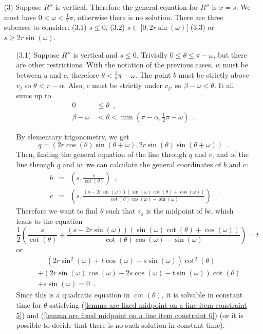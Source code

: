 \documentclass[11pt, oneside]{article}
\begin{document}
\begin{enumerate}
\item[(3)] Suppose $R''$ is vertical.
Therefore the general equation for $R''$ is $x=s$.
We must have
$0< \omega <\frac{1}{2}\pi$,
otherwise there is no solution.
There are three subcases to consider:
(3.1) $s\leq 0$,
(3.2) $s\in\,]0,2r\sin(\omega)[$
(3.3) or $s\geq 2r\sin(\omega)$.

\begin{enumerate}
\item[(3.1)] Suppose $R''$ is vertical and $s\leq 0$.
Trivially $0 \leq \theta \leq \pi-\omega$,
but there are other restrictions.
With the notation of the previous cases,
$w$ must be between $q$ and $c$,
therefore $\theta < \frac{1}{2}\pi-\omega$.
The point $b$ must be strictly above $v_j$
so $\theta < \pi-\alpha$.
Also,
$c$ must be strictly under $v_j$,
so $\beta-\omega < \theta$.
It all sums up to
\begin{align}
\label{lemma arc fixed midpoint on a line item constraint 5}
0 &\,\leq \theta \enspace,\\
\label{lemma arc fixed midpoint on a line item constraint 6}
\beta-\omega &\,< \theta < \min\left(\pi-\alpha,\frac{1}{2}\pi-\omega\right) \enspace.
\end{align}

By elementary trigonometry,
we get
$$q = (2r\cos(\theta)\sin(\theta+\omega),2r\sin(\theta)\sin(\theta+\omega)) \enspace.$$
Then,
finding the general equation of the line through $q$ and $v$,
and of the line through $q$ and $w$,
we can calculate the general coordinates of $b$ and $c$:
\begin{eqnarray*}
b &=& \left(s,\frac{s}{\cot(\theta)}\right) \enspace,\\
c &=& \left(s,\frac{(s-2r\sin(\omega))(\sin(\omega)\cot(\theta)+\cos(\omega))}{\cot(\theta)\cos(\omega)-\sin(\omega)}\right) \enspace.
\end{eqnarray*}
Therefore we want to find $\theta$ such that
$v_j$ is the midpoint of $bc$,
which leads to the equation
$$\frac{1}{2}\left(\frac{s}{\cot(\theta)} + \frac{(s-2r\sin(\omega))(\sin(\omega)\cot(\theta)+\cos(\omega))}{\cot(\theta)\cos(\omega)-\sin(\omega)}\right) = t$$
or
\begin{eqnarray}
\nonumber
&&\phantom{+}(2r\sin^2\!(\omega)+t\cos(\omega)-s\sin(\omega))\cot^2\!(\theta)\\
\nonumber
&&+(2r\sin(\omega)\cos(\omega)-2s\cos(\omega)-t\sin(\omega))\cot(\theta)\\
\label{eqn quad proof 2}
&&+s\sin(\omega) = 0 \enspace.
\end{eqnarray}
Since this is a quadratic equation in $\cot(\theta)$,
it is solvable in constant time 
for $\theta$ satisfying (\ref{lemma arc fixed midpoint on a line item constraint 5})
and (\ref{lemma arc fixed midpoint on a line item constraint 6})
(or it is possible to decide 
that there is no such solution in constant time).


\end{enumerate}
\end{enumerate}
\end{document}
